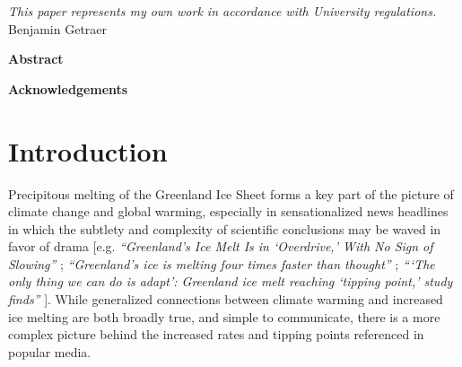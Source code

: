 \documentclass[11pt]{report}
\begin{document}



\thispagestyle{empty}
\vspace*{3in}
\begin{center}
\emph{This paper represents my own work in accordance with University regulations.} \\
Benjamin Getraer %
\end{center}
\clearpage

\begin{center}
\Large \textbf{Abstract}
\end{center}
 
 \clearpage

\begin{center}
\Large \textbf{Acknowledgements}
\end{center}

\clearpage

\thispagestyle{empty}
\tableofcontents
\clearpage

\listoffigures
\listoftables
\clearpage

\fancyhead{}
\fancyfoot{}
\pagestyle{fancyplain}

{\newpage\renewcommand{\thepage}{\arabic{page}}\setcounter{page}{1}}


\section{Introduction \label{sec:introduction}}

Precipitous melting of the Greenland Ice Sheet forms a key part of the picture of climate change and global warming, especially in sensationalized news headlines in which the subtlety and complexity of scientific conclusions may be waved in favor of drama [e.g. \textit{``Greenland's Ice Melt Is in `Overdrive,' With No Sign of Slowing''} \cite[][]{climatenews}; \textit{``Greenland's ice is melting four times faster than thought''} \cite[][]{natgeo}; \textit{```The only thing we can do is adapt': Greenland ice melt reaching `tipping point,' study finds''} \cite[][]{cnn}]. While generalized connections between climate warming and increased ice melting are both broadly true, and simple to communicate, there is a more complex picture behind the increased rates and tipping points referenced in popular media. 
\end{document}
